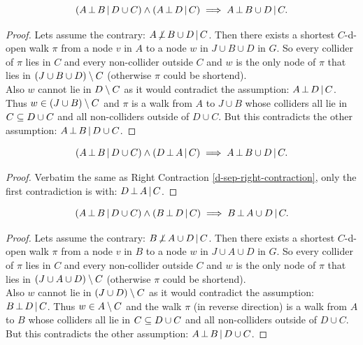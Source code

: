 \begin{Lem}
  \label{d-sep-right-contraction}
    \[ (A \operatorname*{\perp}  B \operatorname*{|} D \cup  C) \land (A \operatorname*{\perp}  D \operatorname*{|} C)  \implies A \operatorname*{\perp}  B \cup  D \operatorname*{|} C.\]
\begin{proof}
    Lets assume the contrary:  $A  \operatorname*{\not\perp}  B \cup D \operatorname*{|} C$.
    Then there exists a shortest $C$-d-open walk $\pi$ 
    from a node $v$ in $A$ to a node $w$ in $J \cup B \cup D$ in $G$.
    So every collider of $\pi$ lies in $C$ and every non-collider outside $C$ and $w$ is 
    the only node of $\pi$ that lies in $(J \cup B \cup D)\setminus C$ (otherwise $\pi$ could be shortend). \\
    Also $w$ cannot lie in $D\setminus C$ as it would contradict the assumption: $A \operatorname*{\perp}  D \operatorname*{|} C$.
    Thus $w \in (J \cup B) \setminus C$ and $\pi$ is a walk from $A$ to $J \cup B$ whose colliders all lie in $C \subseteq D \cup C$ 
    and all non-colliders outside of $D \cup C$.
    But this contradicts the other assumption: $A \operatorname*{\perp}  B \operatorname*{|} D \cup  C$.
\end{proof}
\end{Lem}

\begin{Lem}
    \[ (A \operatorname*{\perp}  B \operatorname*{|} D \cup  C) \land (D \operatorname*{\perp}  A \operatorname*{|} C) \implies A  \operatorname*{\perp}  B \cup  D \operatorname*{|} C.\]
\begin{proof}
    Verbatim the same as Right Contraction \ref{d-sep-right-contraction}, 
    only the first contradiction is with: $D \operatorname*{\perp} A \operatorname*{|} C$.
\end{proof}
\end{Lem}

\begin{Lem}
    \label{d-sep-flc-contraction}
    \[ (A \operatorname*{\perp}  B \operatorname*{|} D \cup  C) \land (B \operatorname*{\perp}  D \operatorname*{|} C) \implies B \operatorname*{\perp}  A \cup  D \operatorname*{|} C.\]
\begin{proof}
    Lets assume the contrary:  $B  \operatorname*{\not\perp}  A \cup D \operatorname*{|} C$.
    Then there exists a shortest $C$-d-open walk $\pi$ 
    from a node $v$ in $B$ to a node $w$ in $J \cup A \cup D$ in $G$.
    So every collider of $\pi$ lies in $C$ and every non-collider outside $C$ and $w$ is 
    the only node of $\pi$ that lies in $(J \cup A \cup D)\setminus C$ (otherwise $\pi$ could be shortend). \\
    Also $w$ cannot lie in $(J \cup D) \setminus C$ as it would contradict the assumption: $B \operatorname*{\perp}  D \operatorname*{|} C$.
    Thus $w \in A \setminus C$ and the walk $\pi$ (in reverse direction) is a walk from $A$ to $B$ whose colliders all lie in 
    $C \subseteq D \cup C$ 
    and all non-colliders outside of $D \cup C$.
    But this contradicts the other assumption: $A \operatorname*{\perp}  B \operatorname*{|} D \cup  C$.
\end{proof}
\end{Lem}


